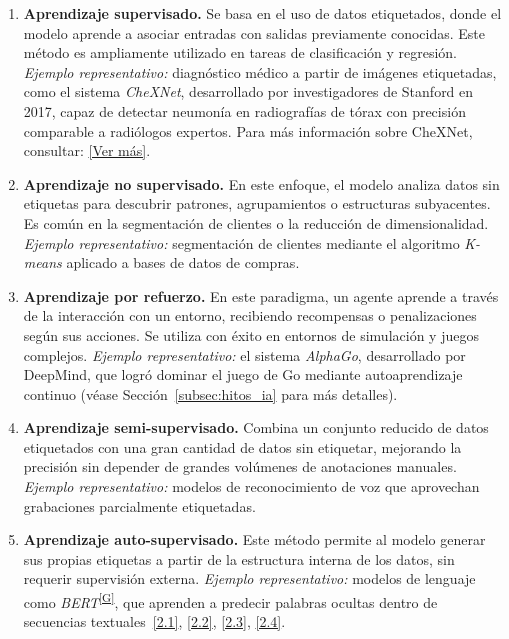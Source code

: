 \documentclass[12pt,a4paper]{report}
\numberwithin{figure}{section}
\begin{document}
\begin{enumerate}
    \item \textbf{Aprendizaje supervisado.}  
    Se basa en el uso de datos etiquetados, donde el modelo aprende a asociar entradas con salidas previamente conocidas. Este método es ampliamente utilizado en tareas de clasificación y regresión.  
    \textit{Ejemplo representativo:} diagnóstico médico a partir de imágenes etiquetadas, como el sistema \textit{CheXNet}, desarrollado por investigadores de Stanford en 2017, capaz de detectar neumonía en radiografías de tórax con precisión comparable a radiólogos expertos. Para más información sobre CheXNet, consultar: \href{https://stanfordmlgroup.github.io/projects/chexnet/}{[Ver más]}.

    \item \textbf{Aprendizaje no supervisado.}  
    En este enfoque, el modelo analiza datos sin etiquetas para descubrir patrones, agrupamientos o estructuras subyacentes. Es común en la segmentación de clientes o la reducción de dimensionalidad.  
    \textit{Ejemplo representativo:} segmentación de clientes mediante el algoritmo \textit{K-means} aplicado a bases de datos de compras.

    \item \textbf{Aprendizaje por refuerzo.}  
    En este paradigma, un agente aprende a través de la interacción con un entorno, recibiendo recompensas o penalizaciones según sus acciones. Se utiliza con éxito en entornos de simulación y juegos complejos.  
    \textit{Ejemplo representativo:} el sistema \textit{AlphaGo}, desarrollado por DeepMind, que logró dominar el juego de Go mediante autoaprendizaje continuo (véase Sección~\ref{subsec:hitos_ia} para más detalles).

    \item \textbf{Aprendizaje semi-supervisado.}  
    Combina un conjunto reducido de datos etiquetados con una gran cantidad de datos sin etiquetar, mejorando la precisión sin depender de grandes volúmenes de anotaciones manuales.  
    \textit{Ejemplo representativo:} modelos de reconocimiento de voz que aprovechan grabaciones parcialmente etiquetadas.

    \item \textbf{Aprendizaje auto-supervisado.}  
    Este método permite al modelo generar sus propias etiquetas a partir de la estructura interna de los datos, sin requerir supervisión externa.  
    \textit{Ejemplo representativo:} modelos de lenguaje como \textit{BERT}\textsuperscript{\hyperref[glos:bert]{[G]}}, que aprenden a predecir palabras ocultas dentro de secuencias textuales~\hyperref[ref:2.1]{[2.1]}, \hyperref[ref:2.2]{[2.2]}, \hyperref[ref:2.3]{[2.3]}, \hyperref[ref:2.4]{[2.4]}.
\end{enumerate}
\end{document}
